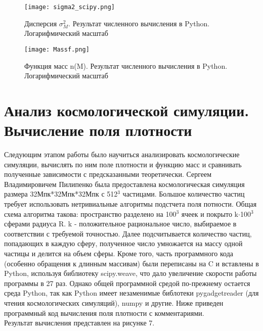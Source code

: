 \documentclass[11pt]{article}
\begin{document}
\begin{figure}[H]
\centering
\texttt{[image: sigma2\_scipy.png]}
\caption{Дисперсия $\sigma_{M}^{2}$. Результат численного вычисления в Python. Логарифмический масштаб}  
\end{figure}

\begin{figure}[H]
\centering
\texttt{[image: Massf.png]}
\caption{Функция масс n(M). Результат численного вычисления в Python. Логарифмический масштаб}  
\end{figure}

\section{Анализ космологической симуляции. Вычисление поля плотности}
Следующим этапом работы было научиться анализировать космологические симуляции, вычислять по ним поле плотности и функцию масс и сравнивать полученные зависимости с предсказанными теоретически. Сергеем Владимировичем Пилипенко была предоставлена космологическая симуляция размера 32Мпк*32Мпк*32Мпк с 512$^3$ частицами. Большое количество частиц требует использовать нетривиальные алгоритмы подстчета поля потности. Общая схема алгоритма такова: пространство разделено на 100$^3$ ячеек и покрыто k$\cdot$100$^3$ сферами радиуса R. k - положительное рациональное число, выбираемое в соответствии с требуемой точностью. Далее подсчитывается количество частиц, попадающих в каждую сферу, полученное число умножается на массу одной частицы и делится на объем сферы. Кроме того, часть программного кода (особенно обращения к длинным массивам) были переписаны на C и вставлены в Python, используя библиотеку scipy.weave, что дало увеличение скорости работы программы в 27 раз. Однако общей программной средой по-прежнему остается среда Python, так как Python имеет незаменимые библотеки pygadgetreader (для чтения космологических симуляций), numpy и другие. Ниже приведен программный код вычисления поля плотности с комментариями.
\\
Результат вычисления представлен на рисунке 7.
\lstset{language=Python}
\end{document}
